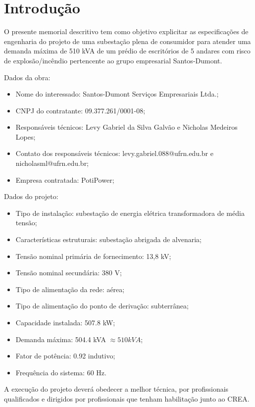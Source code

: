 \section{Introdução}

O presente memorial descritivo tem como objetivo explicitar as especificações de engenharia do projeto de uma subestação plena de consumidor para atender uma demanda máxima de 510 kVA de um prédio de escritórios de 5 andares com risco de explosão/incêndio pertencente ao grupo empresarial Santos-Dumont.

Dados da obra:

\begin{itemize}
    \item Nome do interessado: Santos-Dumont Serviços Empresariais Ltda.;
    \item CNPJ do contratante: 09.377.261/0001-08;
    \item Responsáveis técnicos: Levy Gabriel da Silva Galvão e Nicholas Medeiros Lopes;
    \item Contato dos responsáveis técnicos: levy.gabriel.088@ufrn.edu.br e\\ nicholasml@ufrn.edu.br; 
    \item Empresa contratada: PotiPower;
\end{itemize}

Dados do projeto:

\begin{itemize}
    \item Tipo de instalação: subestação de energia elétrica transformadora de média tensão;
    \item Características estruturais: subestação abrigada de alvenaria;
    \item Tensão nominal primária de fornecimento: 13,8 kV;
    \item Tensão nominal secundária: 380 V;
    \item Tipo de alimentação da rede: aérea;
    \item Tipo de alimentação do ponto de derivação: subterrânea;
    \item Capacidade instalada: 507.8 kW;
    \item Demanda máxima: 504.4 kVA $\approx 510kVA$;
    \item Fator de potência: 0.92 indutivo;
    \item Frequência do sistema: 60 Hz.
\end{itemize}


A execução do projeto deverá obedecer a melhor técnica, por profissionais qualificados e dirigidos por profissionais que tenham habilitação junto ao CREA.

